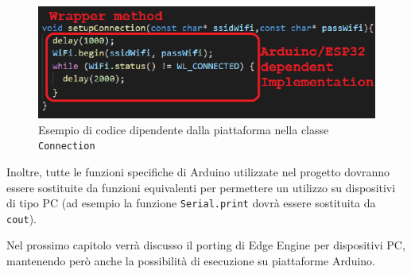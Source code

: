 \begin{figure}[H]
	\centering
	\includegraphics{pics/arduinodependent}
	\caption{Esempio di codice dipendente dalla piattaforma nella classe \texttt{Connection}}
	\label{arduinodep}
\end{figure}

Inoltre, tutte le funzioni specifiche di Arduino utilizzate nel progetto dovranno essere sostituite da funzioni equivalenti per permettere un utilizzo su dispositivi di tipo PC (ad esempio la funzione \texttt{Serial.print} dovrà essere sostituita da \texttt{cout}).

Nel prossimo capitolo verrà discusso il porting di Edge Engine per dispositivi PC, mantenendo però anche la possibilità di esecuzione su piattaforme Arduino.
